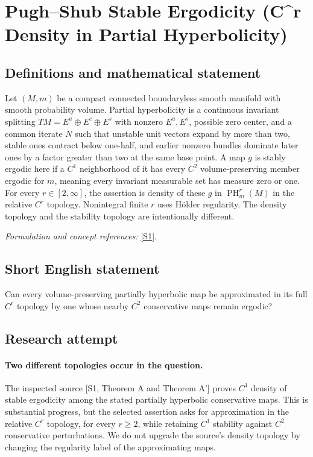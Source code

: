 \documentclass[11pt]{article}
\begin{document}
\section*{\texorpdfstring{Pugh–Shub Stable Ergodicity (C\textasciicircum{}r Density in Partial Hyperbolicity)}{Pugh–Shub Stable Ergodicity (C\textasciicircum{}r Density in Partial Hyperbolicity)}}\label{388}
\subsection{Definitions and mathematical statement}
Let $(M,m)$ be a compact connected boundaryless smooth manifold with smooth probability volume. Partial hyperbolicity is a continuous invariant splitting $TM=E^u\oplus E^c\oplus E^s$ with nonzero $E^u,E^s$, possible zero center, and a common iterate $N$ such that unstable unit vectors expand by more than two, stable ones contract below one-half, and earlier nonzero bundles dominate later ones by a factor greater than two at the same base point. A map $g$ is stably ergodic here if a $C^1$ neighborhood of it has every $C^2$ volume-preserving member ergodic for $m$, meaning every invariant measurable set has measure zero or one. For every $r\in[2,\infty]$, the assertion is density of these $g$ in $\operatorname{PH}_m^r(M)$ in the relative $C^r$ topology. Nonintegral finite $r$ uses H\"older regularity. The density topology and the stability topology are intentionally different.
\par\smallskip\textit{Formulation and concept references:} \href{https://arxiv.org/pdf/1709.04983}{[S1]}.

\subsection{Short English statement}
Can every volume-preserving partially hyperbolic map be approximated in its full $C^r$ topology by one whose nearby $C^2$ conservative maps remain ergodic?
\subsection{Research attempt}
\paragraph{Two different topologies occur in the question.}
The inspected source [S1, Theorem A and Theorem A'] proves
$C^1$ density of stable ergodicity among the stated partially
hyperbolic conservative maps. This is substantial progress, but
the selected assertion asks for approximation in the relative
$C^r$ topology, for every $r\geq2$, while retaining $C^1$ stability
against $C^2$ conservative perturbations. We do not upgrade the
source's density topology by changing the regularity label of the
approximating maps.
\end{document}
